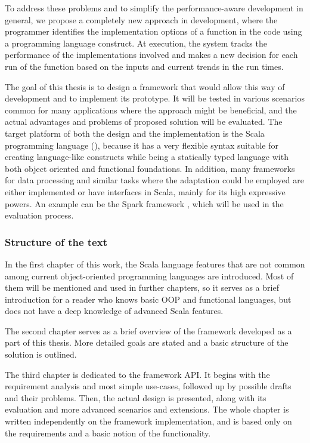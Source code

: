 To address these problems and to simplify the performance-aware development in general, we propose a completely new approach in development, where the programmer identifies the implementation options of a function in the code using a programming language construct. At execution, the system tracks the performance of the implementations involved and makes a new decision for each run of the function based on the inputs and current trends in the run times.

The goal of this thesis is to design a framework that would allow this way of development and to implement its prototype. It will be tested in various scenarios common for many applications where the approach might be beneficial, and the actual advantages and problems of proposed solution will be evaluated. The target platform of both the design and the implementation is the Scala programming language (\cite{noauthor_scala_nodate}), because it has a very flexible syntax suitable for creating language-like constructs while being a statically typed language with both object oriented and functional foundations. In addition, many frameworks for data processing and similar tasks where the adaptation could be employed are either implemented or have interfaces in Scala, mainly for its high expressive powers. An example can be the Spark framework \cite{noauthor_apache_nodate}, which will be used in the evaluation process.

\subsubsection{Structure of the text}

In the first chapter of this work, the Scala language features that are not common among current object-oriented programming languages are introduced. Most of them will be mentioned and used in further chapters, so it serves as a brief introduction for a reader who knows basic OOP and functional languages, but does not have a deep knowledge of advanced Scala features.

The second chapter serves as a brief overview of the framework developed as a part of this thesis. More detailed goals are stated and a basic structure of the solution is outlined.

The third chapter is dedicated to the framework API. It begins with the requirement analysis and most simple use-cases, followed up by possible drafts and their problems. Then, the actual design is presented, along with its evaluation and more advanced scenarios and extensions. The whole chapter is written independently on the framework implementation, and is based only on the requirements and a basic notion of the functionality.

